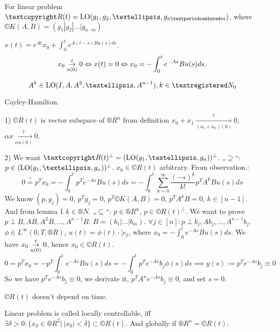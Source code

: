\documentclass[12pt]{article}					%
\begin{document}
\begin{veta}
	For linear problem $©R(t) = \LO (g_1, g_2, …, g_{n·m})$, where $©K(A, B) = (g_1 | g_2 | … | g_{n·m})$

	\begin{tvrzeniin}[Observation]
		$x(t) = e^{At} x_0 + \int_0^t e^{A(t - s) B u(s) ds}$.
		$$ x_0 \underset{u(0)}{\overset{t}\rightarrow} 0 \Leftrightarrow x(t) = 0 \Leftrightarrow x_0 = - \int_0^t e^{-A s} B u(s) ds. $$
	\end{tvrzeniin}

	\begin{lemmain}[1]
		$$ A^k \in \LO(I, A, A^2, …, A^{n - 1}), k \in ®N_0 $$

		\begin{dukazin}
			Cayley-Hamilton.
		\end{dukazin}
	\end{lemmain}

	\begin{dukazin}
		1) $©R(t)$ is vector subspace of $®R^n$ from definition $x_0 + x_1 \underset{(u_1 + u_2)(0)}{\overset{t}\rightarrow} 0$, $\alpha x \underset{\alpha u(0)}{\overset{t}\rightarrow} 0$.

		2) We want $©R(t)^\perp = (\LO(g_1, …, g_n))^\perp$. „$\supseteq$“: $p \in (\LO(g_1, …, g_n))^\perp$. $x_0 \in ©R(t)$ arbitrary. From observation.:
		$$ 0 \overset?= p^T x_0 = -\int_0^t p^Te^{-As} B u(s) ds = - \int_0^t \sum_{k=0}^∞ \frac{(-s)^k}{k!} p^T A^k B u(s) ds$$
		We know $(p, g_j) = 0$, $p^Tg_j = 0$, $p^T ©K(A, B) = 0$, $p^T A^k B = 0$, $k \in [n-1]$. And from lemma 1 $k \in ®N$.
		„$\subseteq$“: $p \in ®R^n$, $p \in ©R(t)^\perp$. We want to prove $p \perp B, AB, A^2B, …, A^{n-1}B$. $B = (b_1 | … | b_m)$. $\forall j \in [n]: p \perp b_j, Ab_j, …, A^{n-1}b_j$. $\phi \in L^∞(0, T, ®R)$, $u(t) = \phi(t)·¦e_j$, where $x_0 = - \int_0^t e^{-A s} B u(s) ds$. We have $x_0 \underset{u(0)}{\overset{t}\rightarrow} 0$, hence $x_0 \in ©R(t)$.
		$$ 0 = p^T x_0 = - p^T\int_0^t e^{-As} B u(s) ds = - \int_0^t p^T e^{-As}b_j \phi(s) ds \implies y(s) := p^T e^{-As}b_j ≡ 0 $$
		So we have $p^T e^{-As} b_j ≡ 0$, we derivate it, $p^T A^n e^{-As} b_j ≡ 0$, and set $s = 0$.
	\end{dukazin}
\end{veta}

\begin{dusledek}
	$©R(t)$ doesn't depend on time.
\end{dusledek}

\begin{definice}
	Linear problem is called locally controllable, iff $\exists \delta > 0: \{x_0 \in ®R^2 |\ |x_0| < \delta\} \subset ©R(t)$. And globally if $®R^n = ©R(t)$.
\end{definice}
\end{document}
